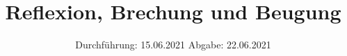 

\subject{V400}
\title{Reflexion, Brechung und Beugung}
\date{%
  Durchführung: 15.06.2021
  \hspace{3em}
  Abgabe: 22.06.2021
}



\maketitle
\thispagestyle{empty}
\tableofcontents
\newpage







\printbibliography{}


